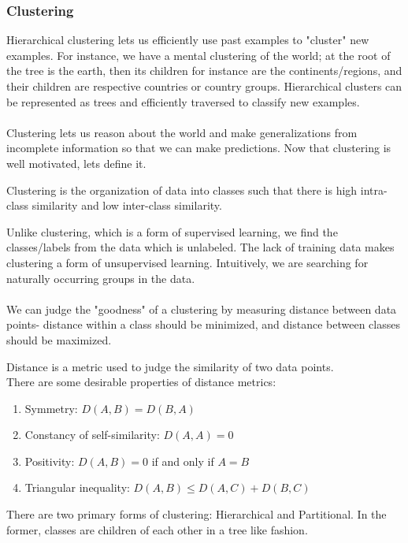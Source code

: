 \documentclass{chezarticle}
\begin{document}
\subsubsection{Clustering}
Hierarchical clustering lets us efficiently use past examples to "cluster" new examples. For instance, we have a mental clustering of the world; at the root of the tree is the earth, then its children for instance are the continents/regions, and their children are respective countries or country groups. Hierarchical clusters can be represented as trees and efficiently traversed to classify new examples.\\
\\
Clustering lets us reason about the world and make generalizations from incomplete information so that we can make predictions. Now that clustering is well motivated, lets define it.
\begin{definition}
Clustering is the organization of data into classes such that there is high intra-class similarity and low inter-class similarity.
\end{definition}
Unlike clustering, which is a form of supervised learning, we find the classes/labels from the data which is unlabeled. The lack of training data makes clustering a form of unsupervised learning. Intuitively, we are searching for naturally occurring groups in the data.\\
\\
We can judge the "goodness" of a clustering by measuring distance between data points- distance within a class should be minimized, and distance between classes should be maximized.
\begin{definition}
Distance is a metric used to judge the similarity of two data points.\\
There are some desirable properties of distance metrics:
\begin{enumerate}
    \item Symmetry: $D(A,B) = D(B,A)$ 
    \item Constancy of self-similarity: $D(A,A) = 0$
    \item Positivity: $D(A,B) = 0$ if and only if $A=B$
    \item Triangular inequality: $D(A,B) \leq D(A,C) + D(B,C)$
\end{enumerate}
\end{definition}
There are two primary forms of clustering: Hierarchical and Partitional. In the former, classes are children of each other in a tree like fashion. \\
\end{document}
